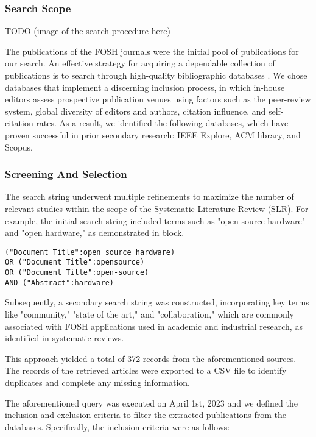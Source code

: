 \documentclass[final-report.tex]{subfiles}
\begin{document}
\subsubsection{Search Scope}

TODO (image of the search procedure here)

The publications of the FOSH journals were the initial pool of publications for our search. An effective strategy for acquiring a dependable collection of publications is to search through high-quality bibliographic databases \cite{petersen2015guidelines}. We chose databases that implement a discerning inclusion process, in which in-house editors assess prospective publication venues using factors such as the peer-review system, global diversity of editors and authors, citation influence, and self-citation rates. As a result, we identified the following databases, which have proven successful in prior secondary research: IEEE Explore, ACM library, and Scopus.

\subsubsection{Screening And Selection}
The search string underwent multiple refinements to maximize the number of relevant studies within the scope of the Systematic Literature Review (SLR). For example, the initial search string included terms such as "open-source hardware" and "open hardware," as demonstrated in block. 
\par
\begin{lstlisting}
("Document Title":open source hardware)
OR ("Document Title":opensource)
OR ("Document Title":open-source)
AND ("Abstract":hardware)
\end{lstlisting}
Subsequently, a secondary search string was constructed, incorporating key terms like "community," "state of the art," and "collaboration," which are commonly associated with FOSH applications used in academic and industrial research, as identified in systematic reviews.

This approach yielded a total of 372 records from the aforementioned sources. The records of the retrieved articles were exported to a CSV file to identify duplicates and complete any missing information.

The aforementioned query was executed on April 1st, 2023 and we defined the inclusion and exclusion criteria to filter the extracted publications from the databases. Specifically, the inclusion criteria were as follows:
\end{document}
